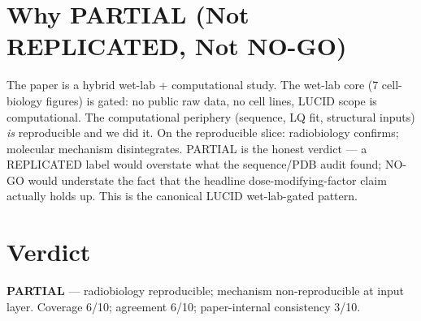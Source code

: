 \documentclass[11pt]{article}
\begin{document}
\section{Why PARTIAL (Not REPLICATED, Not NO-GO)}
The paper is a hybrid wet-lab + computational study. The wet-lab core (7 cell-biology figures) is gated: no public raw data, no cell lines, LUCID scope is computational. The computational periphery (sequence, LQ fit, structural inputs) \emph{is} reproducible and we did it. On the reproducible slice: radiobiology confirms; molecular mechanism disintegrates. PARTIAL is the honest verdict --- a REPLICATED label would overstate what the sequence/PDB audit found; NO-GO would understate the fact that the headline dose-modifying-factor claim actually holds up. This is the canonical LUCID wet-lab-gated pattern.

\section{Verdict}
\textbf{PARTIAL} --- radiobiology reproducible; mechanism non-reproducible at input layer. Coverage 6/10; agreement 6/10; paper-internal consistency 3/10.
\end{document}
